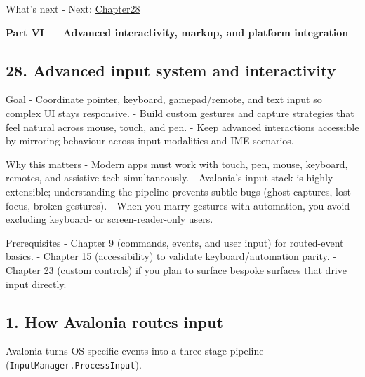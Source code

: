 What's next - Next: \href{Chapter28.md}{Chapter28}

\clearpage
{}
{}
\thispagestyle{empty}
\vspace*{\fill}
\begin{center}
{\Huge\bfseries Part VI — Advanced interactivity, markup, and platform integration}
\end{center}
\vspace*{\fill}
\clearpage

\newpage

\subsection{28. Advanced input system and
interactivity}\label{advanced-input-system-and-interactivity}

Goal - Coordinate pointer, keyboard, gamepad/remote, and text input so
complex UI stays responsive. - Build custom gestures and capture
strategies that feel natural across mouse, touch, and pen. - Keep
advanced interactions accessible by mirroring behaviour across input
modalities and IME scenarios.

Why this matters - Modern apps must work with touch, pen, mouse,
keyboard, remotes, and assistive tech simultaneously. - Avalonia's input
stack is highly extensible; understanding the pipeline prevents subtle
bugs (ghost captures, lost focus, broken gestures). - When you marry
gestures with automation, you avoid excluding keyboard- or
screen-reader-only users.

Prerequisites - Chapter 9 (commands, events, and user input) for
routed-event basics. - Chapter 15 (accessibility) to validate
keyboard/automation parity. - Chapter 23 (custom controls) if you plan
to surface bespoke surfaces that drive input directly.

\subsection{1. How Avalonia routes
input}\label{how-avalonia-routes-input}

Avalonia turns OS-specific events into a three-stage pipeline
(\passthrough{\lstinline!InputManager.ProcessInput!}).

